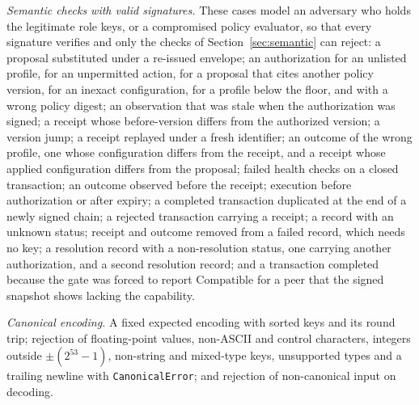 \documentclass[journal]{IEEEtran}
\newcommand{\Compatible}{\mathrm{Compatible}}
\newcommand{\code}[1]{\texttt{\footnotesize #1}}
\begin{document}
\emph{Semantic checks with valid signatures.} These cases model an adversary who holds the legitimate role keys, or a compromised policy evaluator, so that every signature verifies and only the checks of Section~\ref{sec:semantic} can reject: a proposal substituted under a re-issued envelope; an authorization for an unlisted profile, for an unpermitted action, for a proposal that cites another policy version, for an inexact configuration, for a profile below the floor, and with a wrong policy digest; an observation that was stale when the authorization was signed; a receipt whose before-version differs from the authorized version; a version jump; a receipt replayed under a fresh identifier; an outcome of the wrong profile, one whose configuration differs from the receipt, and a receipt whose applied configuration differs from the proposal; failed health checks on a closed transaction; an outcome observed before the receipt; execution before authorization or after expiry; a completed transaction duplicated at the end of a newly signed chain; a rejected transaction carrying a receipt; a record with an unknown status; receipt and outcome removed from a failed record, which needs no key; a resolution record with a non-resolution status, one carrying another authorization, and a second resolution record; and a transaction completed because the gate was forced to report $\Compatible$ for a peer that the signed snapshot shows lacking the capability.

\emph{Canonical encoding.} A fixed expected encoding with sorted keys and its round trip; rejection of floating-point values, non-ASCII and control characters, integers outside $\pm(2^{53}-1)$, non-string and mixed-type keys, unsupported types and a trailing newline with \code{CanonicalError}; and rejection of non-canonical input on decoding.
\end{document}
